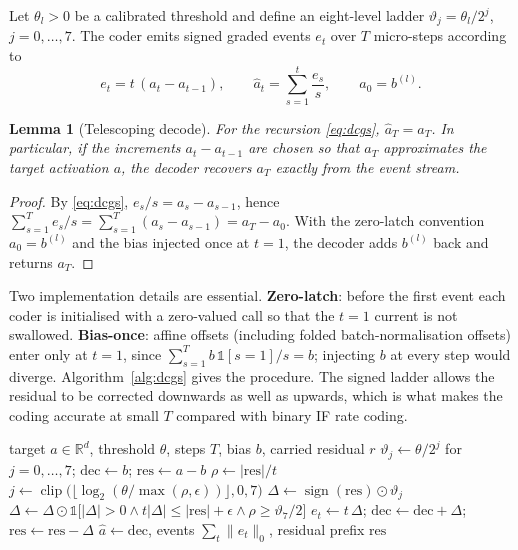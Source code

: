 \documentclass[preprint,12pt]{elsarticle}
\newtheorem{lemma}{Lemma}
\begin{document}
Let $\theta_l>0$ be a calibrated threshold and define an eight-level ladder $\vartheta_j=\theta_l/2^{j}$, $j=0,\ldots,7$. The coder emits signed graded events $e_t$ over $T$ micro-steps according to
\begin{equation}
e_t=t\,(a_t-a_{t-1}),\qquad \hat a_t=\sum_{s=1}^{t}\frac{e_s}{s},\qquad a_0=b^{(l)}.
\label{eq:dcgs}
\end{equation}

\begin{lemma}[Telescoping decode]
For the recursion \eqref{eq:dcgs}, $\hat a_T=a_T$. In particular, if the increments $a_t-a_{t-1}$ are chosen so that $a_T$ approximates the target activation $a$, the decoder recovers $a_T$ exactly from the event stream.
\end{lemma}
\begin{proof}
By \eqref{eq:dcgs}, $e_s/s=a_s-a_{s-1}$, hence $\sum_{s=1}^{T}e_s/s=\sum_{s=1}^{T}(a_s-a_{s-1})=a_T-a_0$. With the zero-latch convention $a_0=b^{(l)}$ and the bias injected once at $t=1$, the decoder adds $b^{(l)}$ back and returns $a_T$.
\end{proof}

Two implementation details are essential. \textbf{Zero-latch}: before the first event each coder is initialised with a zero-valued call so that the $t{=}1$ current is not swallowed. \textbf{Bias-once}: affine offsets (including folded batch-normalisation offsets) enter only at $t{=}1$, since $\sum_{s=1}^{T}b\,\mathbb 1[s{=}1]/s=b$; injecting $b$ at every step would diverge. Algorithm~\ref{alg:dcgs} gives the procedure. The signed ladder allows the residual to be corrected downwards as well as upwards, which is what makes the coding accurate at small $T$ compared with binary IF rate coding.

\begin{algorithm}[t]
\caption{DCGS differential coding of one ReLU site}
\label{alg:dcgs}
\begin{algorithmic}[1]
\Require target $a\in\mathbb R^d$, threshold $\theta$, steps $T$, bias $b$, carried residual $r$
\State $\vartheta_j\leftarrow\theta/2^j$ for $j=0,\ldots,7$; \quad $\mathrm{dec}\leftarrow b$; \quad $\mathrm{res}\leftarrow a-b$
  \State $\rho\leftarrow|\mathrm{res}|/t$
  \State $j\leftarrow\operatorname{clip}\big(\lfloor\log_2(\theta/\max(\rho,\epsilon))\rfloor,0,7\big)$
  \State $\Delta\leftarrow\operatorname{sign}(\mathrm{res})\odot\vartheta_{j}$
  \State $\Delta\leftarrow\Delta\odot\mathbb 1\big[|\Delta|>0 \wedge t|\Delta|\le|\mathrm{res}|+\epsilon \wedge \rho\ge\vartheta_7/2\big]$
  \State $e_t\leftarrow t\,\Delta$; \quad $\mathrm{dec}\leftarrow\mathrm{dec}+\Delta$; \quad $\mathrm{res}\leftarrow\mathrm{res}-\Delta$
\EndFor
\State \Return $\hat a\leftarrow\mathrm{dec}$, events $\sum_t\|e_t\|_0$, residual prefix $\mathrm{res}$
\end{algorithmic}
\end{algorithm}
\end{document}
